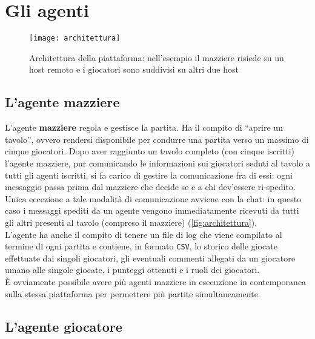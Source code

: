 \section{Gli agenti}



\begin{figure}[!htbp]
\centering
\texttt{[image: architettura]}%
\caption{Architettura della piattaforma: nell'esempio il mazziere risiede su un host remoto e i giocatori sono suddivisi su altri due host} \label{fig:architettura-piattaforma}
\end{figure}


\subsection{L'agente mazziere}

L'agente \textbf{mazziere} regola e gestisce la partita.
Ha il compito di ``aprire un tavolo'', ovvero rendersi disponibile per condurre una partita verso un massimo di cinque giocatori.
Dopo aver raggiunto un tavolo completo (con cinque iscritti) l'agente mazziere, pur comunicando le informazioni sui giocatori seduti al tavolo a tutti gli agenti iscritti, si fa carico di gestire la comunicazione fra di essi: ogni messaggio passa prima dal mazziere che decide se e a chi dev'essere ri-spedito.\\
Unica eccezione a tale modalità di comunicazione avviene con la chat: in questo caso i messaggi spediti da un agente vengono immediatamente ricevuti da tutti gli altri presenti al tavolo (compreso il mazziere) (\ref{fig:architettura}).\\
L'agente ha anche il compito di tenere un file di log che viene compilato al termine di ogni partita e contiene, in formato \texttt{CSV}, lo storico delle giocate effettuate dai singoli giocatori, gli eventuali commenti allegati da un giocatore umano alle singole giocate, i punteggi ottenuti e i ruoli dei giocatori.\\
È ovviamente possibile avere più agenti mazziere in esecuzione in contemporanea sulla stessa piattaforma per permettere più partite simultaneamente.\\

\subsection{L'agente giocatore}

